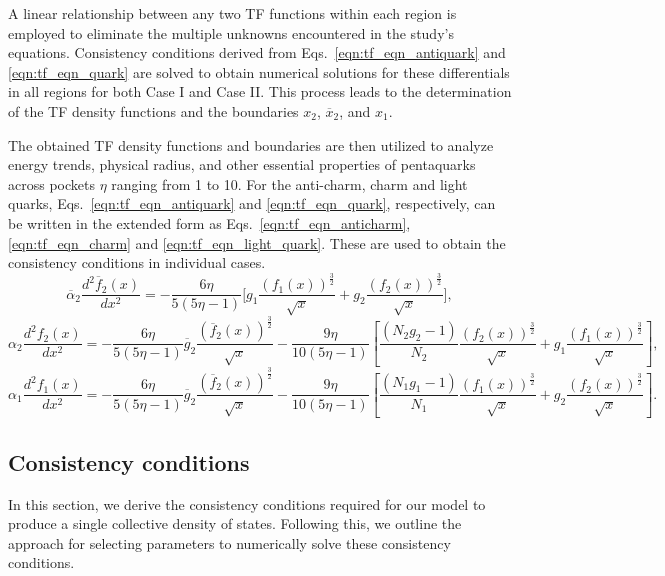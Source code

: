 \documentclass[fleqn]{article}
\begin{document}
        A linear relationship between any two TF functions within each region is employed to eliminate the multiple unknowns encountered in the study's equations. Consistency conditions derived from Eqs.~\eqref{eqn:tf_eqn_antiquark} and \eqref{eqn:tf_eqn_quark} are solved to obtain numerical solutions for these differentials in all regions for both Case I and Case II. This process leads to the determination of the TF density functions and the boundaries $x_2$, $\overline{x}_{2}$, and $x_1$. 
        
        The obtained TF density functions and boundaries are then utilized to analyze energy trends, physical radius, and other essential properties of pentaquarks across pockets $\eta$ ranging from 1 to 10.
        For the anti-charm, charm and light quarks, Eqs.~\eqref{eqn:tf_eqn_antiquark} and \eqref{eqn:tf_eqn_quark}, respectively, can be written in the extended form as Eqs.~\eqref{eqn:tf_eqn_anticharm}, \eqref{eqn:tf_eqn_charm} and \eqref{eqn:tf_eqn_light_quark}. These are used to obtain the consistency conditions in individual cases.
        \begin{equation}
         \overline{\alpha}_2 \frac{d^2\overline{f}_{2}(x)}{dx^2}= -\frac{6\eta}{5(5\eta-1)} \biggl[ g_1 \frac{(f_1(x))^\frac{3}{2}}{\sqrt{x}} + g_2 \frac{(f_2(x))^\frac{3}{2}}{\sqrt{x}} \biggr],
         \label{eqn:tf_eqn_anticharm}
        \end{equation}
        \begin{equation}
        \alpha_2 \frac{d^2 f_2(x)}{dx^2}=-\frac{6\eta}{5(5\eta-1)}    \overline{g}_{2} \frac{\left( \overline{f}_{2}(x) \right)^\frac{3}{2}}{\sqrt{x}} - \frac{9\eta}{10(5\eta-1)}\left[\frac{(N_2 g_2-1)}{N_2} \frac{\left( f_2(x) \right)^\frac{3}{2}}{\sqrt{x}}
        + g_1 \frac{\left( f_1(x) \right)^\frac{3}{2}}{\sqrt{x}} \right],
        \label{eqn:tf_eqn_charm}
        \end{equation}
        \begin{equation}
        \alpha_1 \frac{d^2 f_1(x)}{dx^2}= -\frac{6 \eta}{5(5 \eta -1)}\overline{g}_{2} \frac{(\overline{f}_{2}(x))^\frac{3}{2}}{\sqrt{x}}-\frac{9\eta}{10(5\eta-1)}\left[\frac{(N_1 g_1-1)}{N_1} \frac{\left( f_1(x) \right)^\frac{3}{2}}{\sqrt{x}}
        + g_2 \frac{\left( f_2(x) \right)^\frac{3}{2}}{\sqrt{x}} \right].
        \label{eqn:tf_eqn_light_quark}
        \end{equation}
        
    \subsection{Consistency conditions}
    \label{subsection:cons_condn}
        In this section, we derive the consistency conditions required for our model to produce a single collective density of states. Following this, we outline the approach for selecting parameters to numerically solve these consistency conditions.
        
\end{document}
